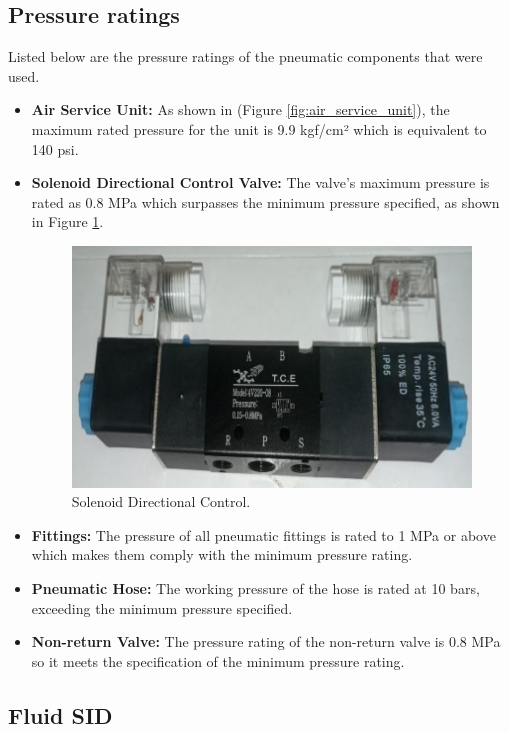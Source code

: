 \documentclass[11pt, twocolumn]{article}
\begin{document}
\subsection{Pressure ratings}

Listed below are the pressure ratings of the pneumatic components that were used.

\begin{itemize}[leftmargin=0pt, itemindent=10pt]
    \setlength{\itemsep}{0pt}
    \vspace{-0.3cm}
    \item \textbf{Air Service Unit:} As shown in (Figure \ref{fig:air_service_unit}), the maximum rated pressure for the unit is 9.9 kgf/cm² which is equivalent to 140 psi.
    \item \textbf{Solenoid Directional Control Valve:} The valve's maximum pressure is rated as 0.8 MPa which surpasses the minimum pressure specified, as shown in Figure \ref{fig:solenoid}.
    \begin{figure}[h!]
        \centering
        \includegraphics[width=0.6\columnwidth]{Images/Solenoid Directional Control.jpg}
        \caption{Solenoid Directional Control.}
        \label{fig:solenoid}
    \end{figure}
    \vspace{-0.3cm}
    \item \textbf{Fittings:} The pressure of all pneumatic fittings is rated to 1 MPa or above which makes them comply with the minimum pressure rating.
    \item \textbf{Pneumatic Hose:} The working pressure of the hose is rated at 10 bars, exceeding the minimum pressure specified. 
    \item \textbf{Non-return Valve:} The pressure rating of the non-return valve is 0.8 MPa so it meets the specification of the minimum pressure rating.
\end{itemize}

\vspace{-0.3cm}
\subsection{Fluid SID}
\end{document}
